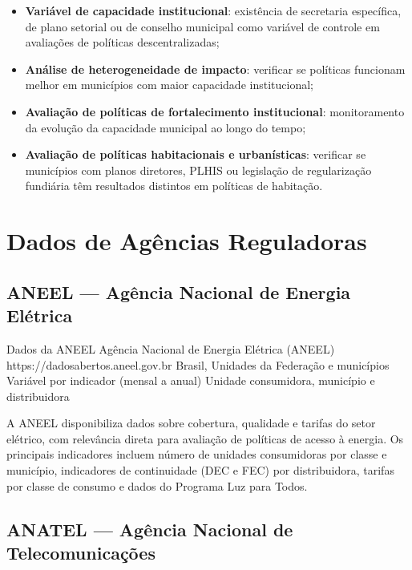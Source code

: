 \begin{itemize}
  \item \textbf{Variável de capacidade institucional}: existência de secretaria específica, de plano setorial ou de conselho municipal como variável de controle em avaliações de políticas descentralizadas;
  \item \textbf{Análise de heterogeneidade de impacto}: verificar se políticas funcionam melhor em municípios com maior capacidade institucional;
  \item \textbf{Avaliação de políticas de fortalecimento institucional}: monitoramento da evolução da capacidade municipal ao longo do tempo;
  \item \textbf{Avaliação de políticas habitacionais e urbanísticas}: verificar se municípios com planos diretores, PLHIS ou legislação de regularização fundiária têm resultados distintos em políticas de habitação.
\end{itemize}

\section{Dados de Agências Reguladoras}

\subsection{ANEEL --- Agência Nacional de Energia Elétrica}

\ficharapida
  {Dados da ANEEL}
  {Agência Nacional de Energia Elétrica (ANEEL)}
  {https://dadosabertos.aneel.gov.br}
  {Brasil, Unidades da Federação e municípios}
  {Variável por indicador (mensal a anual)}
  {Unidade consumidora, município e distribuidora}

A ANEEL disponibiliza dados sobre cobertura, qualidade e tarifas do setor elétrico, com relevância direta para avaliação de políticas de acesso à energia. Os principais indicadores incluem número de unidades consumidoras por classe e município, indicadores de continuidade (DEC e FEC) por distribuidora, tarifas por classe de consumo e dados do Programa Luz para Todos.

\subsection{ANATEL --- Agência Nacional de Telecomunicações}

